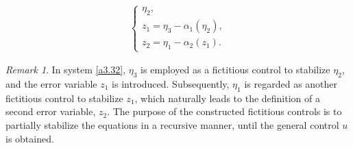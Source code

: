 \documentclass[10pt, a4paper]{amsart}
\theoremstyle{plain}
\theoremstyle{definition}
\theoremstyle{remark}
\newtheorem{remark}[lemma]{Remark}
\numberwithin{equation}{section}
\begin{document}
\begin{align}\label{a3.32}
\begin{cases}
\eta_2,\\
 z_{1} = \eta_{3}-\alpha_1(\eta_2),\\  
 z_{2} = \eta_{1} - \alpha_2(z_1).
\end{cases}
\end{align}
\begin{remark}
In system \eqref{a3.32}, $\eta_3$ is employed as a fictitious control to stabilize $\eta_2$, and the error variable $z_1$ is introduced. Subsequently, $\eta_1$ is regarded as another fictitious control to stabilize $z_1$, which naturally leads to the definition of a second error variable, $z_2$. The purpose of the constructed fictitious controls is to partially stabilize the equations in a recursive manner, until the general control $u$ is obtained.
\end{remark}
\end{document}
